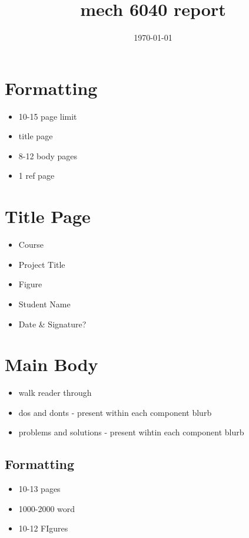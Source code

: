 \documentclass[11pt]{article}
\date{\today}
\title{mech 6040 report}
\begin{document}
\maketitle
\tableofcontents


\section{Formatting}
\label{sec:org98177fe}
\begin{itemize}
\item 10-15 page limit
\item title page
\item 8-12 body pages
\item 1 ref page
\end{itemize}

\section{Title Page}
\label{sec:orgde1566f}
\begin{itemize}
\item Course
\item Project Title
\item Figure
\item Student Name
\item Date \& Signature?
\end{itemize}

\section{Main Body}
\label{sec:orgcfabd61}
\begin{itemize}
\item walk reader through
\item dos and donts - present within each component blurb
\item problems and solutions - present wihtin each component blurb
\end{itemize}

\subsection{Formatting}
\label{sec:org396b4de}
\begin{itemize}
\item 10-13 pages
\item 1000-2000 word
\item 10-12 FIgures
\end{itemize}
\end{document}
